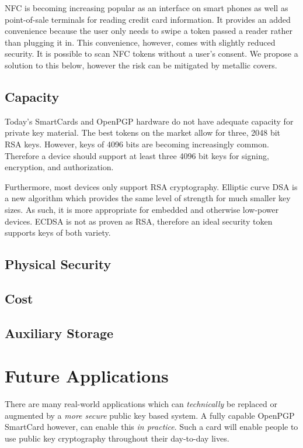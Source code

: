 \documentclass[11pt, twocolumn]{article}
\begin{document}
NFC is becoming increasing popular as an interface on smart phones as well as
point-of-sale terminals for reading credit card information. It provides an
added convenience because the user only needs to swipe a token passed a reader
rather than plugging it in. This convenience, however, comes with slightly
reduced security. It is possible to scan NFC tokens without a user's consent. We
propose a solution to this below, however the risk can be mitigated by metallic
covers.

\subsection{Capacity}

Today's SmartCards and OpenPGP hardware do not have adequate capacity for
private key material. The best tokens on the market allow for three, 2048 bit
RSA keys. However, keys of 4096 bits are becoming increasingly common. Therefore
a device should support at least three 4096 bit keys for signing, encryption,
and authorization.

Furthermore, most devices only support RSA cryptography. Elliptic curve DSA is a
new algorithm which provides the same level of strength for much smaller key
sizes. As such, it is more appropriate for embedded and otherwise low-power
devices. ECDSA is not as proven as RSA, therefore an ideal security token
supports keys of both variety.

\subsection{Physical Security}

\subsection{Cost}

\subsection{Auxiliary Storage}

\section{Future Applications}
\label{sec:future}

There are many real-world applications which can \textit{technically} be
replaced or augmented by a \textit{more secure} public key based system. A fully
capable OpenPGP SmartCard however, can enable this \textit{in practice}. Such a
card will enable people to use public key cryptography throughout their
day-to-day lives.
\end{document}
